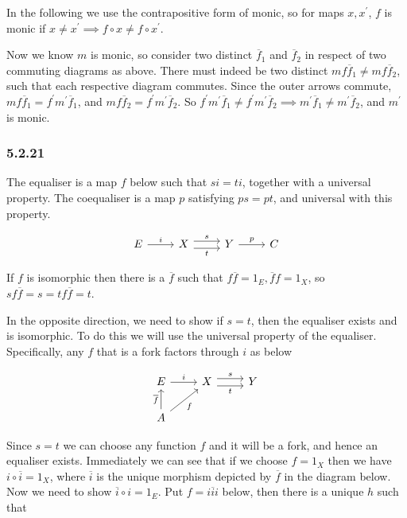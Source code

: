 \documentclass{article}
\begin{document}
In the following we use the contrapositive form of monic, so for maps $x, x^\prime$, $f$ is monic if $x \neq x^\prime \implies f \circ x \neq f \circ x^\prime$.

Now we know $m$ is monic, so consider two distinct $\overline{f}_1$ and $\overline{f}_2$ in respect of two commuting diagrams as above. There must indeed be two distinct $mf\overline{f}_1 \neq mf\overline{f}_2$, such that each respective diagram commutes. Since the outer arrows commute, $mf\overline{f}_1 = f^\prime m^\prime \overline{f}_1$, and $mf\overline{f}_2 = f^\prime m^\prime \overline{f}_2$. So $f^\prime m^\prime \overline{f}_1 \neq f^\prime m^\prime \overline{f}_2 \implies m^\prime \overline{f}_1 \neq m^\prime \overline{f}_2$, and $m^\prime$ is monic.

\subsubsection*{5.2.21}

The equaliser is a map $f$ below such that $si = ti$, together with a universal property. The coequaliser is a map $p$ satisfying $ps=pt$, and universal with this property.

\begin{equation*}
\begin{tikzcd}
E  \ar[r,"i"] &
X \ar[r,shift left=.75ex,"s"]
  \ar[r,shift right=.75ex,swap,"t"] & Y
  \ar[r,"p"] & C
\end{tikzcd}
\end{equation*}

If $f$ is isomorphic then there is a $\overline{f}$ such that $f\overline{f}=1_E, \overline{f}f=1_X$, so $sf\overline{f} = s = tf\overline{f}=t$.

In the opposite direction, we need to show if $s=t$, then the equaliser exists and is isomorphic. To do this we will use the universal property of the equaliser. Specifically, any $f$ that is a fork factors through $i$ as below

\begin{equation*}
\begin{tikzcd}
  E \ar[r,"i"] & X \ar[r,shift left=.75ex,"s"]
  \ar[r,shift right=.75ex,swap,"t"] & Y \\
  A \ar[u,"\overline{f}"] \ar[ur,swap,"f"] &
\end{tikzcd}
\end{equation*}

Since $s=t$ we can choose any function $f$ and it will be a fork, and hence an equaliser exists. Immediately we can see that if we choose $f=1_X$ then we have $i \circ \overline{i}=1_X$, where $\overline{i}$ is the unique morphism depicted by $\overline{f}$ in the diagram below. Now we need to show $\overline{i} \circ i = 1_E$. Put $f=i\overline{i}i$ below, then there is a unique $h$ such that
\end{document}
